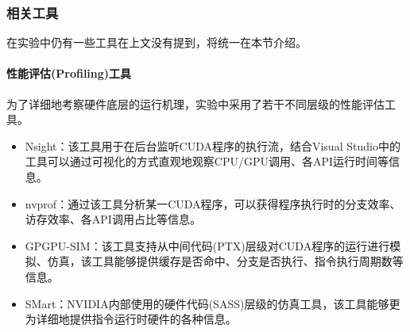 \subsubsection{相关工具}
\par 在实验中仍有一些工具在上文没有提到，将统一在本节介绍。
\paragraph{性能评估(Profiling)工具}
\par 为了详细地考察硬件底层的运行机理，实验中采用了若干不同层级的性能评估工具。
\begin{itemize}
	\item Nsight：该工具用于在后台监听CUDA程序的执行流，结合Visual Studio中的工具可以通过可视化的方式直观地观察CPU/GPU调用、各API运行时间等信息\parencite{NSIGHT}。
	\item nvprof：通过该工具分析某一CUDA程序，可以获得程序执行时的分支效率、访存效率、各API调用占比等信息\parencite{NVPROF}。
	\item GPGPU-SIM：该工具支持从中间代码(PTX)层级对CUDA程序的运行进行模拟、仿真，该工具能够提供缓存是否命中、分支是否执行、指令执行周期数等信息\parencite{GPGPUSIM}。
	\item SMart：NVIDIA内部使用的硬件代码(SASS)层级的仿真工具，该工具能够更为详细地提供指令运行时硬件的各种信息。
\end{itemize}
